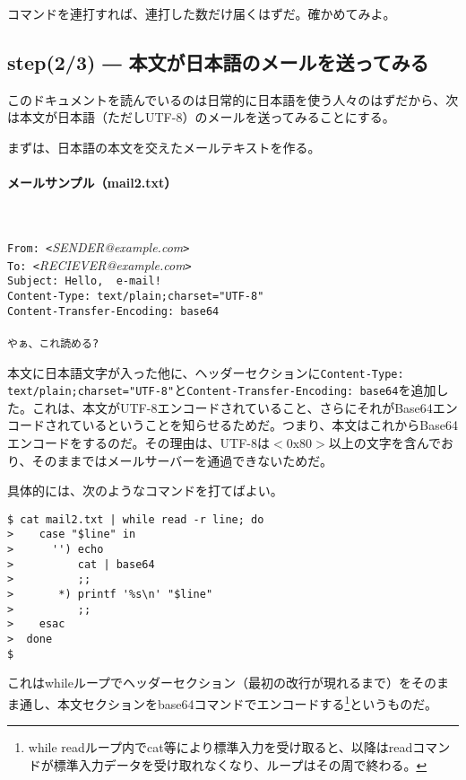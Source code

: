 コマンドを連打すれば、連打した数だけ届くはずだ。確かめてみよ。

\subsection*{step(2/3) ― 本文が日本語のメールを送ってみる}

このドキュメントを読んでいるのは日常的に日本語を使う人々のはずだから、次は本文が日本語（ただしUTF-8）のメールを送ってみることにする。

まずは、日本語の本文を交えたメールテキストを作る。
\paragraph{メールサンプル（mail2.txt）}　\\
\begin{frameboxit}{160.0mm}
	\verb|From: <|\textit{SENDER@example.com}\verb|>| \\
	\verb|To: <|\textit{RECIEVER@example.com}\verb|>| \\
	\verb|Subject: Hello,  e-mail!| \\
	\verb|Content-Type: text/plain;charset="UTF-8"| \\
	\verb|Content-Transfer-Encoding: base64| \\
	\verb|| \\
	\verb|やぁ、これ読める?|
\end{frameboxit}

本文に日本語文字が入った他に、ヘッダーセクションに\verb|Content-Type: text/plain;charset="UTF-8"|と\verb|Content-Transfer-Encoding: base64|を追加した。これは、本文がUTF-8エンコードされていること、さらにそれがBase64エンコードされているということを知らせるためだ。つまり、本文はこれからBase64エンコードをするのだ。その理由は、UTF-8は$<\mathrm{0x80}>$以上の文字を含んでおり、そのままではメールサーバーを通過できないためだ。

具体的には、次のようなコマンドを打てばよい。
\begin{screen}
	\verb!$ cat mail2.txt | while read -r line; do! \return \\
	\verb!>    case "$line" in! \return                     \\
	\verb!>      '') echo! \return                          \\
	\verb!>          cat | base64! \return                  \\
	\verb!>          ;;! \return                            \\
	\verb!>       *) printf '%s\n' "$line"! \return         \\
	\verb!>          ;;! \return                            \\
	\verb!>    esac! \return                                \\
	\verb!>  done! \return                                  \\
	\verb!$ !
\end{screen}
これはwhileループでヘッダーセクション（最初の改行が現れるまで）をそのまま通し、本文セクションをbase64コマンドでエンコードする\footnote{while readループ内でcat等により標準入力を受け取ると、以降はreadコマンドが標準入力データを受け取れなくなり、ループはその周で終わる。}というものだ。

